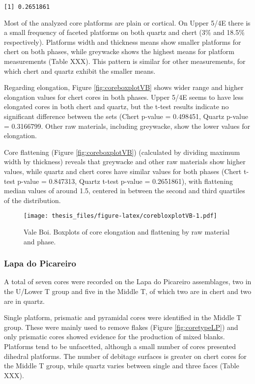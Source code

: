 \documentclass[12pt,twoside]{reedthesis}
\begin{document}
\begin{verbatim}
[1] 0.2651861
\end{verbatim}
Most of the analyzed core platforms are plain or cortical. On Upper 5/4E there is a small frequency of faceted platforms on both quartz and chert (3\% and 18.5\% respectively). Platforms width and thickness means show smaller platforms for chert on both phases, while greywacke shows the highest means for platform measurements (Table XXX). This pattern is similar for other measurements, for which chert and quartz exhibit the smaller means.

Regarding elongation, Figure \ref{fig:coreboxplotVB} shows wider range and higher elongation values for chert cores in both phases. Upper 5/4E seems to have less elongated cores in both chert and quartz, but the t-test results indicate no significant difference between the sets (Chert p-value = 0.498451, Quartz p-value = 0.3166799. Other raw materials, including greywacke, show the lower values for elongation.

Core flattening (Figure \ref{fig:coreboxplotVB}) (calculated by dividing maximum width by thickness) reveals that greywacke and other raw materials show higher values, while quartz and chert cores have similar values for both phases (Chert t-test p-value = 0.847313, Quartz t-test p-value = 0.2651861), with flattening median values of around 1.5, centered in between the second and third quartiles of the distribution.
\begin{figure}
\centering
\texttt{[image: thesis\_files/figure-latex/corebloxplotVB-1.pdf]}
\caption{\label{fig:corebloxplotVB}Vale Boi. Boxplots of core elongation and flattening by raw material and phase.}
\end{figure}
\hypertarget{lapa-do-picareiro-4}{%
\subsubsection{Lapa do Picareiro}\label{lapa-do-picareiro-4}}

A total of seven cores were recorded on the Lapa do Picareiro assemblages, two in the U/Lower T group and five in the Middle T, of which two are in chert and two are in quartz.

Single platform, prismatic and pyramidal cores were identified in the Middle T group. These were mainly used to remove flakes (Figure \ref{fig:coretypeLP}) and only prismatic cores showed evidence for the production of mixed blanks. Platforms tend to be unfacetted, although a small number of cores presented dihedral platforms. The number of debitage surfaces is greater on chert cores for the Middle T group, while quartz varies between single and three faces (Table XXX).
\end{document}

